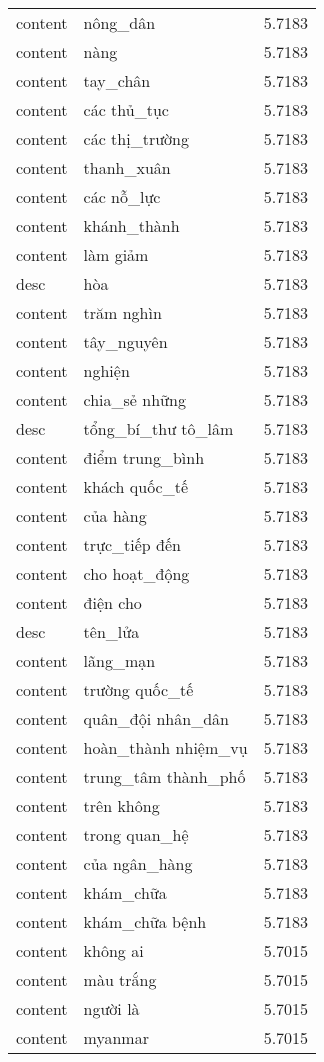 \documentclass{article}
\begin{document}
\begin{tabular}{lll}
content & nông\_dân & 5.7183\\
content & nàng & 5.7183\\
content & tay\_chân & 5.7183\\
content & các thủ\_tục & 5.7183\\
content & các thị\_trường & 5.7183\\
content & thanh\_xuân & 5.7183\\
content & các nỗ\_lực & 5.7183\\
content & khánh\_thành & 5.7183\\
content & làm giảm & 5.7183\\
desc & hòa & 5.7183\\
content & trăm nghìn & 5.7183\\
content & tây\_nguyên & 5.7183\\
content & nghiện & 5.7183\\
content & chia\_sẻ những & 5.7183\\
desc & tổng\_bí\_thư tô\_lâm & 5.7183\\
content & điểm trung\_bình & 5.7183\\
content & khách quốc\_tế & 5.7183\\
content & của hàng & 5.7183\\
content & trực\_tiếp đến & 5.7183\\
content & cho hoạt\_động & 5.7183\\
content & điện cho & 5.7183\\
desc & tên\_lửa & 5.7183\\
content & lãng\_mạn & 5.7183\\
content & trường quốc\_tế & 5.7183\\
content & quân\_đội nhân\_dân & 5.7183\\
content & hoàn\_thành nhiệm\_vụ & 5.7183\\
content & trung\_tâm thành\_phố & 5.7183\\
content & trên không & 5.7183\\
content & trong quan\_hệ & 5.7183\\
content & của ngân\_hàng & 5.7183\\
content & khám\_chữa & 5.7183\\
content & khám\_chữa bệnh & 5.7183\\
content & không ai & 5.7015\\
content & màu trắng & 5.7015\\
content & người là & 5.7015\\
content & myanmar & 5.7015\\

\end{tabular}
\end{document}
